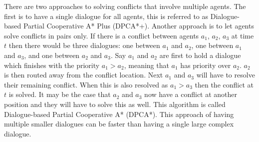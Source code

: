 

%
%

There are two approaches to solving conflicts that involve multiple agents. The
first is to have a single dialogue for all agents, this is referred to as
Dialogue-based Partial Cooperative A* Plus (DPCA*+). Another approach is to let
agents solve conflicts in pairs only. If there is a conflict between agents
$a_1$, $a_2$, $a_3$ at time $t$ then there would be three dialogues: one
between $a_1$ and $a_2$, one between $a_1$ and $a_3$, and one between $a_2$ and
$a_3$. Say $a_1$ and $a_2$ are first to hold a dialogue which finishes with the
priority $a_1 > a_2$, meaning that $a_1$ has priority over $a_2$. $a_2$ is then
routed away from the conflict location. Next $a_1$ and $a_3$ will have to
resolve their remaining conflict. When this is also resolved as $a_1 > a_3$
then the conflict at $t$ is solved. It may be the case that $a_2$ and $a_3$ now
have a conflict at another position and they will have to solve this as well.
This algorithm is called Dialogue-based Partial Cooperative A* (DPCA*). This
approach of having multiple smaller dialogues can be faster than having a
single large complex dialogue.

